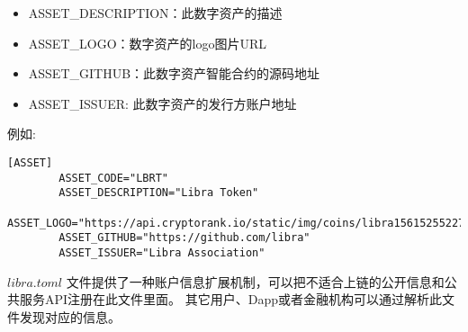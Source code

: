 \begin{itemize}
\begin{itemize}
            \item ASSET\_DESCRIPTION：此数字资产的描述

            \item ASSET\_LOGO：数字资产的logo图片URL

            \item ASSET\_GITHUB：此数字资产智能合约的源码地址

            \item ASSET\_ISSUER: 此数字资产的发行方账户地址
        \end{itemize}
        例如:
        \begin{lstlisting}[caption={资产配置信息}, label={lst:validator}]
        [ASSET]
        ASSET_CODE="LBRT"
        ASSET_DESCRIPTION="Libra Token"
        ASSET_LOGO="https://api.cryptorank.io/static/img/coins/libra1561525522731.png"
        ASSET_GITHUB="https://github.com/libra"
        ASSET_ISSUER="Libra Association"
        \end{lstlisting}
\end{itemize}

$libra.toml$ 文件提供了一种账户信息扩展机制，可以把不适合上链的公开信息和公共服务API注册在此文件里面。
其它用户、Dapp或者金融机构可以通过解析此文件发现对应的信息。
